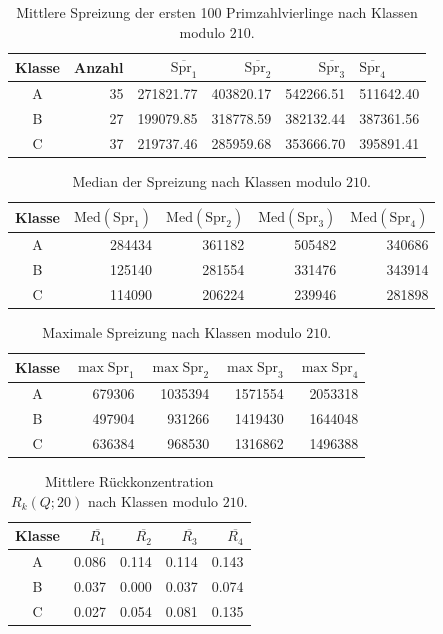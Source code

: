 \begin{table}[htbp]
\centering
\small
\begin{tabular}{crrrr}
\hline
Klasse & Anzahl & $\overline{\mathrm{Spr}_1}$ & $\overline{\mathrm{Spr}_2}$ & $\overline{\mathrm{Spr}_3}$ & $\overline{\mathrm{Spr}_4}$ \\
\hline
A & 35 & 271821.77 & 403820.17 & 542266.51 & 511642.40 \\
B & 27 & 199079.85 & 318778.59 & 382132.44 & 387361.56 \\
C & 37 & 219737.46 & 285959.68 & 353666.70 & 395891.41 \\
\hline
\end{tabular}
\caption{Mittlere Spreizung der ersten 100 Primzahlvierlinge nach Klassen modulo $210$.}
\end{table}

\begin{table}[htbp]
\centering
\small
\begin{tabular}{crrrr}
\hline
Klasse & $\mathrm{Med}(\mathrm{Spr}_1)$ & $\mathrm{Med}(\mathrm{Spr}_2)$ & $\mathrm{Med}(\mathrm{Spr}_3)$ & $\mathrm{Med}(\mathrm{Spr}_4)$ \\
\hline
A & 284434 & 361182 & 505482 & 340686 \\
B & 125140 & 281554 & 331476 & 343914 \\
C & 114090 & 206224 & 239946 & 281898 \\
\hline
\end{tabular}
\caption{Median der Spreizung nach Klassen modulo $210$.}
\end{table}

\begin{table}[htbp]
\centering
\small
\begin{tabular}{crrrr}
\hline
Klasse & $\max \mathrm{Spr}_1$ & $\max \mathrm{Spr}_2$ & $\max \mathrm{Spr}_3$ & $\max \mathrm{Spr}_4$ \\
\hline
A & 679306 & 1035394 & 1571554 & 2053318 \\
B & 497904 & 931266 & 1419430 & 1644048 \\
C & 636384 & 968530 & 1316862 & 1496388 \\
\hline
\end{tabular}
\caption{Maximale Spreizung nach Klassen modulo $210$.}
\end{table}

\begin{table}[htbp]
\centering
\small
\begin{tabular}{crrrr}
\hline
Klasse & $\overline{R_1}$ & $\overline{R_2}$ & $\overline{R_3}$ & $\overline{R_4}$ \\
\hline
A & 0.086 & 0.114 & 0.114 & 0.143 \\
B & 0.037 & 0.000 & 0.037 & 0.074 \\
C & 0.027 & 0.054 & 0.081 & 0.135 \\
\hline
\end{tabular}
\caption{Mittlere R\"uckkonzentration $R_k(Q;20)$ nach Klassen modulo $210$.}
\end{table}

